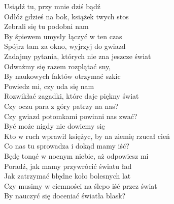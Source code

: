     
Usiądź tu, przy mnie dziś bądź\\
Odłóż gdzieś na bok, książek twych stos\\
Zebrali się tu podobni nam\\
By śpiewem umysły łączyć w ten czas\\
\hop
Spójrz tam za okno, wyjrzyj do gwiazd\\
Zadajmy pytania, których nie zna jeszcze świat\\
Odważmy się razem rozplątać sny, \\
By naukowych faktów otrzymać szkic\\
\hops
Powiedz mi, czy uda się nam\\
Rozwikłać zagadki, które daje piękny świat\\
Czy oczu para z góry patrzy na nas? \\
Czy gwiazd potomkami powinni nas zwać?\\
\hop
Być może nigdy nie dowiemy się \\
Kto w ruch wprawił księżyc, by na ziemię rzucał cień\\ 
Co nas tu sprowadza i dokąd mamy iść?\\
Będę tonąć w nocnym niebie, aż odpowiesz mi\\
\hop
Poradź, jak mamy przywrócić światu ład\\
Jak zatrzymać błędne koło bolesnych lat\\
Czy musimy w ciemności na ślepo iść przez świat\\
By nauczyć się doceniać światła blask?
